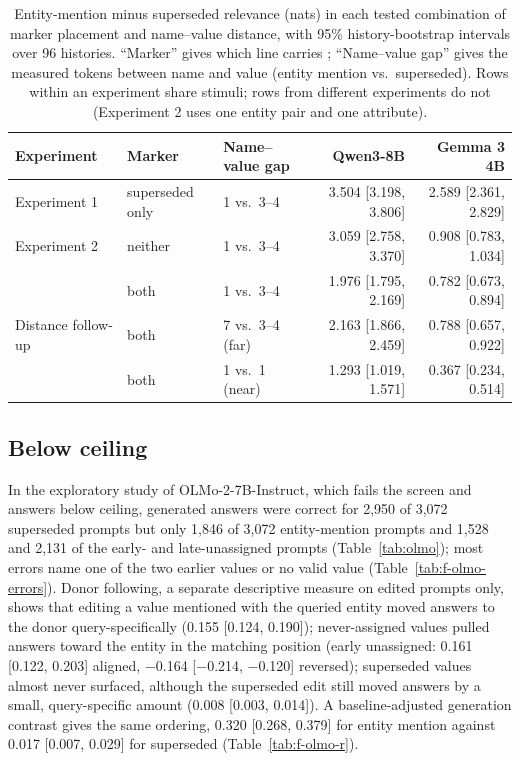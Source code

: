 \begin{table}[t]
\caption{Entity-mention minus superseded relevance (nats) in each tested combination of marker placement and name--value distance, with 95\% history-bootstrap intervals over 96 histories. ``Marker'' gives which line carries ; ``Name--value gap'' gives the measured tokens between name and value (entity mention vs.\ superseded). Rows within an experiment share stimuli; rows from different experiments do not (Experiment 2 uses one entity pair and one attribute).}
\label{tab:gap}
\begin{center}
\small
\begin{tabular}{@{}lllrr@{}}
\toprule
Experiment & Marker & Name--value gap & Qwen3-8B & Gemma 3 4B \\
\midrule
Experiment 1 & superseded only & 1 vs.\ 3--4 & 3.504 [3.198, 3.806] & 2.589 [2.361, 2.829] \\
\midrule
Experiment 2 & neither & 1 vs.\ 3--4 & 3.059 [2.758, 3.370] & 0.908 [0.783, 1.034] \\
 & both & 1 vs.\ 3--4 & 1.976 [1.795, 2.169] & 0.782 [0.673, 0.894] \\
\midrule
Distance follow-up & both & 7 vs.\ 3--4 (far) & 2.163 [1.866, 2.459] & 0.788 [0.657, 0.922] \\
 & both & 1 vs.\ 1 (near) & 1.293 [1.019, 1.571] & 0.367 [0.234, 0.514] \\
\bottomrule
\end{tabular}
\end{center}
\end{table}

\subsection{Below ceiling}
\label{sec:below-ceiling}

In the exploratory study of OLMo-2-7B-Instruct, which fails the screen and answers below ceiling, generated answers were correct for 2,950 of 3,072 superseded prompts but only 1,846 of 3,072 entity-mention prompts and 1,528 and 2,131 of the early- and late-unassigned prompts (Table~\ref{tab:olmo}); most errors name one of the two earlier values or no valid value (Table~\ref{tab:f-olmo-errors}). Donor following, a separate descriptive measure on edited prompts only, shows that editing a value mentioned with the queried entity moved answers to the donor query-specifically (0.155 [0.124, 0.190]); never-assigned values pulled answers toward the entity in the matching position (early unassigned: 0.161 [0.122, 0.203] aligned, −0.164 [−0.214, −0.120] reversed); superseded values almost never surfaced, although the superseded edit still moved answers by a small, query-specific amount (0.008 [0.003, 0.014]). A baseline-adjusted generation contrast gives the same ordering, 0.320 [0.268, 0.379] for entity mention against 0.017 [0.007, 0.029] for superseded (Table~\ref{tab:f-olmo-r}).

